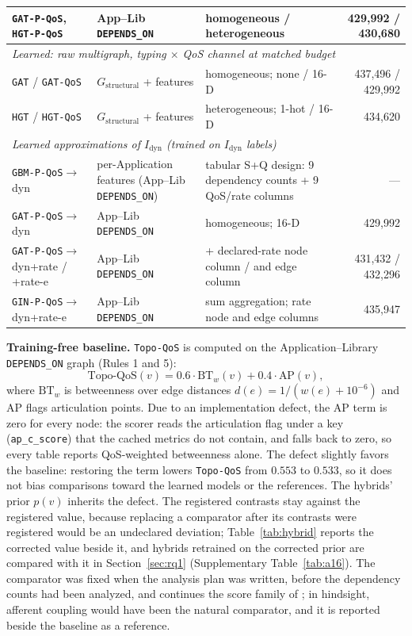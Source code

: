 \begin{table}[htbp]
{\begin{tabular}{lllr}
\texttt{GAT-P-QoS}, \texttt{HGT-P-QoS} & App--Lib \texttt{DEPENDS\_ON} & homogeneous / heterogeneous & 429{,}992 / 430{,}680 \\
\midrule
\multicolumn{4}{l}{\textit{Learned: raw multigraph, typing $\times$ QoS channel at matched budget}} \\
\texttt{GAT} / \texttt{GAT-QoS} & $G_{\text{structural}}$ + features & homogeneous; none / 16-D & 437{,}496 / 429{,}992 \\
\texttt{HGT} / \texttt{HGT-QoS} & $G_{\text{structural}}$ + features & heterogeneous; 1-hot / 16-D & 434{,}620 \\
\midrule
\multicolumn{4}{l}{\textit{Learned approximations of $I_{\text{dyn}}$ (trained on $I_{\text{dyn}}$ labels)}} \\
\texttt{GBM-P-QoS}$\to$dyn & per-Application features (App--Lib \texttt{DEPENDS\_ON}) & tabular S+Q design: 9 dependency counts + 9 QoS/rate columns & --- \\
\texttt{GAT-P-QoS}$\to$dyn & App--Lib \texttt{DEPENDS\_ON} & homogeneous; 16-D & 429{,}992 \\
\texttt{GAT-P-QoS}$\to$dyn+rate / +rate-e & App--Lib \texttt{DEPENDS\_ON} & + declared-rate node column / and edge column & 431{,}432 / 432{,}296 \\
\texttt{GIN-P-QoS}$\to$dyn+rate-e & App--Lib \texttt{DEPENDS\_ON} & sum aggregation; rate node and edge columns & 435{,}947 \\
\bottomrule
\end{tabular}%
}
\end{table}

\noindent\textbf{Training-free baseline.} \texttt{Topo-QoS} is computed on the Application--Library \texttt{DEPENDS\_ON} graph (Rules 1 and 5):
\begin{equation}
\label{eq:topo}
\text{Topo-QoS}(v) = 0.6 \cdot \text{BT}_{w}(v) + 0.4 \cdot \text{AP}(v),
\end{equation}
where $\text{BT}_{w}$ is betweenness over edge distances $d(e) = 1/(w(e) + 10^{-6})$ and AP flags articulation points. Due to an implementation defect, the AP term is zero for every node: the scorer reads the articulation flag under a key (\texttt{ap\_c\_score}) that the cached metrics do not contain, and falls back to zero, so every table reports QoS-weighted betweenness alone. The defect slightly favors the baseline: restoring the term lowers \texttt{Topo-QoS} from $0.553$ to $0.533$, so it does not bias comparisons toward the learned models or the references. The hybrids' prior $p(v)$ inherits the defect. The registered contrasts stay against the registered value, because replacing a comparator after its contrasts were registered would be an undeclared deviation; Table~\ref{tab:hybrid} reports the corrected value beside it, and hybrids retrained on the corrected prior are compared with it in Section~\ref{sec:rq1} (Supplementary Table~\ref{tab:a16}). The comparator was fixed when the analysis plan was written, before the dependency counts had been analyzed, and continues the score family of \cite{yigit2025graph}; in hindsight, afferent coupling would have been the natural comparator, and it is reported beside the baseline as a reference.

